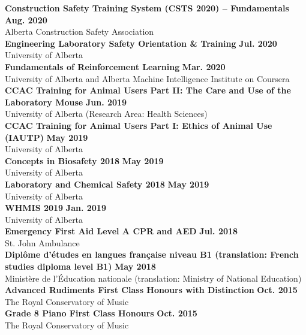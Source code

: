 \documentclass{article}
\begin{document}
    \textbf{Construction Safety Training System (CSTS 2020) -- Fundamentals} \hfill \textbf{Aug. 2020}\\
    Alberta Construction Safety Association\\[0.5em]
	\textbf{Engineering Laboratory Safety Orientation \& Training} \hfill \textbf{Jul. 2020}\\
	University of Alberta\\[0.5em]
    \textbf{Fundamentals of Reinforcement Learning} \hfill \textbf{Mar. 2020}\\
    University of Alberta and Alberta Machine Intelligence Institute on Coursera\\[0.5em]
    \textbf{CCAC Training for Animal Users Part II: The Care and Use of the Laboratory Mouse} \hfill \textbf{Jun. 2019}\\
    University of Alberta (Research Area: Health Sciences)\\[0.5em]
    \textbf{CCAC Training for Animal Users Part I: Ethics of Animal Use (IAUTP)} \hfill \textbf{May 2019}\\
    University of Alberta\\[0.5em]
    \textbf{Concepts in Biosafety 2018} \hfill \textbf{May 2019}\\
    University of Alberta\\[0.5em]
    \textbf{Laboratory and Chemical Safety 2018} \hfill \textbf{May 2019}\\
    University of Alberta\\[0.5em]
    \textbf{WHMIS 2019} \hfill \textbf{Jan. 2019}\\
    University of Alberta\\[0.5em]
    \textbf{Emergency First Aid Level A CPR and AED} \hfill \textbf{Jul. 2018}\\
    St. John Ambulance\\[0.5em]
    \textbf{Dipl\^ome d'\'etudes en langues fran\c{c}aise niveau B1 (translation: French studies diploma level B1)} \hfill \textbf{May 2018}\\
    Minist\`ere de l'\'Education nationale (translation: Ministry of National Education)\\[0.5em]
    \textbf{Advanced Rudiments First Class Honours with Distinction} \hfill \textbf{Oct. 2015}\\
    The Royal Conservatory of Music\\[0.5em]
    \textbf{Grade 8 Piano First Class Honours} \hfill \textbf{Oct. 2015}\\
    The Royal Conservatory of Music
\end{document}
